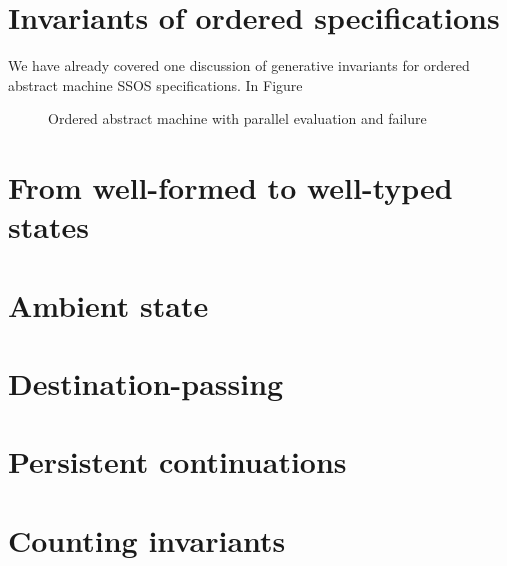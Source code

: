\section{Invariants of ordered specifications}
\label{sec:gen-order}

We have already covered one discussion of generative invariants for 
ordered abstract machine SSOS specifications. In Figure 

\begin{figure}[tp]
\caption{Ordered abstract machine with parallel evaluation and failure}
\label{fig:ssos-fail}
\end{figure}


\section{From well-formed to well-typed states}
\label{sec:gen-ordertp}

\section{Ambient state}
\label{sec:gen-state}





\section{Destination-passing}
\label{sec:gen-destinations}


\section{Persistent continuations}
\label{sec:gen-letcc}

\section{Counting invariants}
\label{sec:gen-count}



\label{sec:pointer-inequality}
